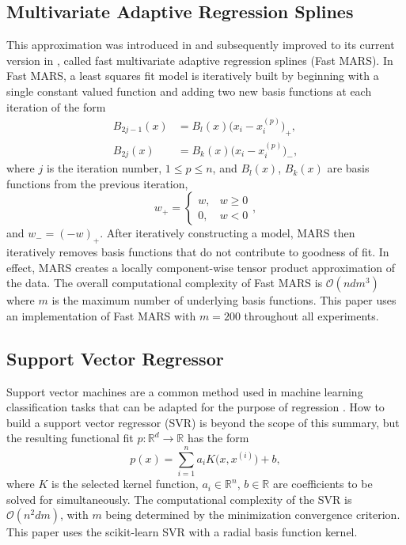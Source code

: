 \documentclass[smallextended,final]{svjour3}  %
\begin{document}
\subsection{Multivariate Adaptive Regression Splines}
\label{sec:mars}
This approximation was introduced in \cite{friedman1991multivariate}
and subsequently improved to its current version in
\cite{stanford1993fast}, called fast multivariate adaptive regression
splines (Fast MARS). In Fast MARS, a least squares fit model is
iteratively built by beginning with a single constant valued function
and adding two new basis functions at each iteration of the form
\begin{align*}
  B_{2j-1}(x) &= B_l(x) \bigl(x_i-x^{(p)}_i\bigr)_+, \\
  B_{2j}(x) &= B_k(x) \bigl(x_i-x^{(p)}_i\bigr)_- ,
\end{align*}
where $j$ is the iteration number, $1 \le p \le n$, and $B_l(x)$,
$B_k(x)$ are basis functions from the previous iteration,
 $$w_+ = \begin{cases} w, & w \geq 0 \\ 0, & w < 0 \end{cases},$$
and $w_- = (-w)_+$. After iteratively constructing a model, MARS then
iteratively removes basis functions that do not contribute to goodness
of fit. In effect, MARS creates a locally component-wise tensor
product approximation of the data. The overall computational
complexity of Fast MARS is $\mathcal{O}(n d m^3)$ where $m$ is the
maximum number of underlying basis functions. This paper uses an
implementation of Fast MARS \cite{rudy2017pyearth} with $m = 200$
throughout all experiments.

\subsection{Support Vector Regressor}
\label{sec:svr}
Support vector machines are a common method used in machine learning
classification tasks that can be adapted for the purpose of regression
\cite{basak2007support}. How to build a support vector regressor (SVR)
is beyond the scope of this summary, but the resulting functional fit
$p : \mathbb{R}^d \rightarrow \mathbb{R}$ has the form
 $$ p(x)  = \sum_{i=1}^{n}a_i K\bigl(x,x^{(i)}\bigr) + b ,$$
where $K$ is the selected kernel function, $a_i \in \mathbb{R}^n$, 
$b \in \mathbb{R}$ are coefficients to be solved for simultaneously.
The computational complexity of the SVR is $\mathcal{O}(n^2dm)$, with
$m$ being determined by the minimization convergence criterion. This
paper uses the scikit-learn SVR \cite{scikit-learn} with a radial
basis function kernel.
\end{document}
